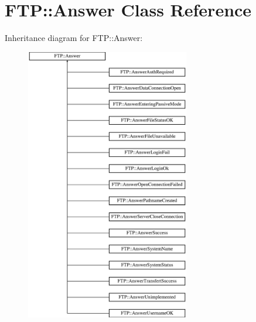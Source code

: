 \hypertarget{class_f_t_p_1_1_answer}{\section{F\-T\-P\-:\-:Answer Class Reference}
\label{class_f_t_p_1_1_answer}
}
Inheritance diagram for F\-T\-P\-:\-:Answer\-:\begin{figure}[H]
\begin{center}
\leavevmode
\includegraphics[height=12.000000cm]{class_f_t_p_1_1_answer}
\end{center}
\end{figure}
